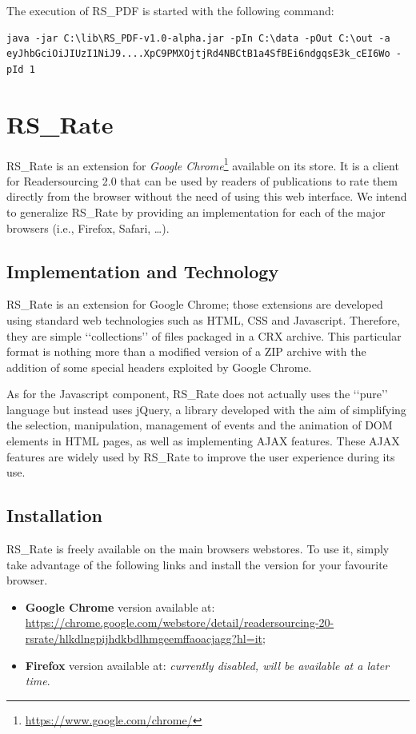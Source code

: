 \documentclass[a4paper, english]{article}
\begin{document}
The execution of RS\_PDF is started with the following command:
\begin{lstlisting}
java -jar C:\lib\RS_PDF-v1.0-alpha.jar -pIn C:\data -pOut C:\out -a eyJhbGciOiJIUzI1NiJ9....XpC9PMXOjtjRd4NBCtB1a4SfBEi6ndgqsE3k_cEI6Wo -pId 1
\end{lstlisting}

\section{RS\_Rate}

\label{rs-rate}

RS\_Rate \cite{RS-Rate} is an extension for \emph{Google Chrome}\footnote{\url{https://www.google.com/chrome/}} available on its store. It is a client for Readersourcing 2.0 that can be used by readers of publications to rate them directly from the browser without the need of using this web interface. We intend to generalize RS\_Rate by providing an implementation for each of the major browsers (i.e., Firefox, Safari, \dots).

\subsection{Implementation and Technology}

RS\_Rate is an extension for Google Chrome; those extensions are developed using standard web technologies such as HTML, CSS and Javascript. Therefore, they are simple \lq\lq collections\rq\rq{} of files packaged in a CRX archive. This particular format is nothing more than a modified version of a ZIP archive with the addition of some special headers exploited by Google Chrome.

As for the Javascript component, RS\_Rate does not actually uses the \lq\lq pure\rq\rq{} language but instead uses jQuery, a library developed with the aim of simplifying the selection, manipulation, management of events and the animation of DOM elements in HTML pages, as well as implementing AJAX features. These AJAX features are widely used by RS\_Rate to improve the user experience during its use.

\subsection{Installation}

RS\_Rate is freely available on the main browsers webstores. To use it, simply take advantage of the following links and install the version for your favourite browser.
\begin{itemize}
\item \textbf{Google Chrome} version available at: \url{https://chrome.google.com/webstore/detail/readersourcing-20-rsrate/hlkdlngpijhdkbdlhmgeemffaoacjagg?hl=it};
\item \textbf{Firefox} version available at: \emph{currently disabled, will be available at a later time}.
\end{itemize}
\end{document}
